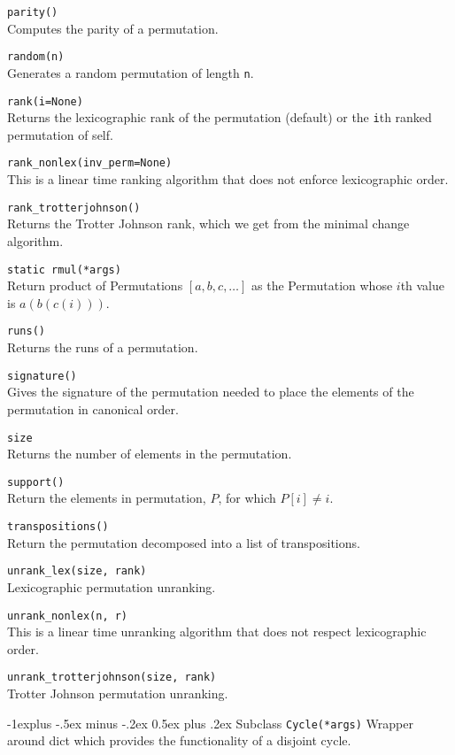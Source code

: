 \documentclass[10pt,landscape]{article}
\makeatletter
\renewcommand{\subsection}{\@startsection{subsection}{2}{0mm}%
                                {-1explus -.5ex minus -.2ex}%
                                {0.5ex plus .2ex}%
                                {\normalfont\normalsize\bfseries}}
\makeatother
\begin{document}
\begin{multicols}{3}
\verb!parity()!\\
Computes the parity of a permutation.


\verb!random(n)!\\
Generates a random permutation of length \verb!n!.


\verb!rank(i=None)!\\
Returns the lexicographic rank of the permutation
(default) or the \verb!i!th ranked permutation of self.


\verb!rank_nonlex(inv_perm=None)!\\
This is a linear time ranking algorithm
that does not enforce lexicographic order.


\verb!rank_trotterjohnson()!\\
Returns the Trotter Johnson rank, which we get from the minimal change algorithm.


\verb!static rmul(*args)!\\
Return product of Permutations $[a, b, c, \ldots]$ as the Permutation whose $i$th value is $a(b(c(i)))$.


\verb!runs()!\\
Returns the runs of a permutation.


\verb!signature()!\\
Gives the signature of the permutation needed to place the elements
 of the permutation in canonical order.


\verb!size!\\
Returns the number of elements in the permutation.


\verb!support()!\\
Return the elements in permutation, $P$, for which $P[i] \neq i$.



\verb!transpositions()!\\
Return the permutation decomposed into a list of transpositions.


\verb!unrank_lex(size, rank)!\\
Lexicographic permutation unranking.



\verb!unrank_nonlex(n, r)!\\
This is a linear time unranking algorithm that does not respect lexicographic order.


\verb!unrank_trotterjohnson(size, rank)!\\
Trotter Johnson permutation unranking.

\subsection{Subclass \texttt{Cycle(*args)}}
Wrapper around dict which provides the functionality of a disjoint cycle.



\end{multicols}
\end{document}
